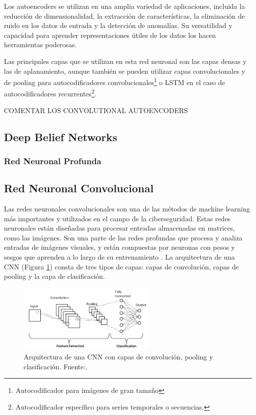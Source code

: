 Los autoencoders se utilizan en una amplia variedad de aplicaciones, incluida la reducción de dimensionalidad, la extracción de características, la eliminación de ruido en los datos de entrada y la detección de anomalías. Su versatilidad y capacidad para aprender representaciones útiles de los datos los hacen herramientas poderosas.


Las principales capas que se utilizan en esta red neuronal son las capas densas y las de aplanamiento, aunque también se pueden utilizar capas convolucionales y de pooling para autocodificadores convolucionales\footnote{Autocodificador para imágenes de gran tamaño} o LSTM en el caso de autocodificadores recurrentes\footnote{Autocodificador específico para series temporales o secuencias.}\citep{geron2022hands}. 


COMENTAR LOS CONVOLUTIONAL AUTOENCODERS



\subsection{Deep Belief Networks}
\subsubsection{Red Neuronal Profunda}
\subsection{Red Neuronal Convolucional} \label{sec:2.CNN}


Las redes neuronales convolucionales son una de las métodos de machine learning más importantes y utilizados en el campo de la ciberseguridad. Estas redes neuronales están diseñadas para procesar entradas almacenadas en matrices, como las imágenes.  Son una parte de las redes profundas que procesa y analiza entradas de imágenes visuales, y están compuestas por neuronas con pesos y sesgos que aprenden a lo largo de su entrenamiento \citep{podder2021artificial}. La arquitectura de una CNN (Figura \ref{fig:cnn_architecture}) consta de tres tipos de capas: capas de convolución, capas de pooling y la capa de clasificación. 
 

\begin{figure}[h]
    \centering
    \includegraphics[width=0.6\textwidth]{img/convlayers.png}
    \caption{Arquitectura de una CNN con capas de convolución, pooling y clasificación. Fuente:\citep{phung2018deep}.}
    \label{fig:cnn_architecture}
\end{figure}

